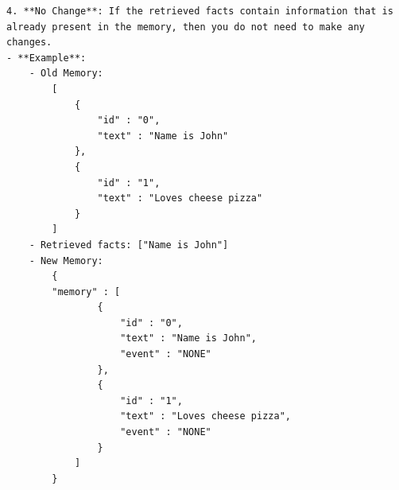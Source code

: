\documentclass[11pt]{article}
\begin{document}
\begin{lstlisting}
4. **No Change**: If the retrieved facts contain information that is already present in the memory, then you do not need to make any changes.
- **Example**:
    - Old Memory:
        [
            {
                "id" : "0",
                "text" : "Name is John"
            },
            {
                "id" : "1",
                "text" : "Loves cheese pizza"
            }
        ]
    - Retrieved facts: ["Name is John"]
    - New Memory:
        {
        "memory" : [
                {
                    "id" : "0",
                    "text" : "Name is John",
                    "event" : "NONE"
                },
                {
                    "id" : "1",
                    "text" : "Loves cheese pizza",
                    "event" : "NONE"
                }
            ]
        }
\end{lstlisting}
\end{document}
